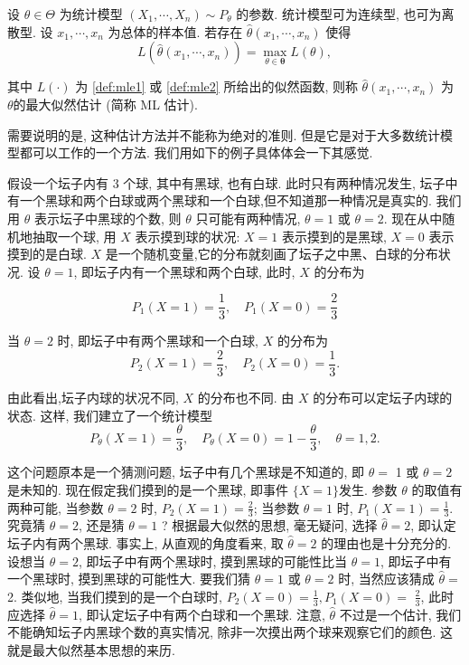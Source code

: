 \begin{definition}
    设 $\theta \in \Theta$ 为统计模型 $\left(X_1, \cdots, X_n\right) \sim P_\theta$ 的参数. 统计模型可为连续型, 也可为离散型. 设 $x_1, \cdots, x_n$ 为总体的样本值. 若存在 $\hat{\theta}\left(x_1, \cdots, x_n\right)$ 使得
$$
L\left(\hat{\theta}\left(x_1, \cdots, x_n\right)\right)=\max _{\theta \in \boldsymbol{\theta}} L(\theta),
$$

其中 $L(\cdot)$ 为 \cref{def:mle1} 或 \cref{def:mle2} 所给出的似然函数, 则称 $\hat{\theta}\left(x_1, \cdots, x_n\right)$ 为 $\theta$的最大似然估计 (简称 ML 估计).
\end{definition}

需要说明的是, 这种估计方法并不能称为绝对的准则. 但是它是对于大多数统计模型都可以工作的一个方法. 我们用如下的例子具体体会一下其感觉. 

\begin{example}
    假设一个坛子内有 3 个球, 其中有黑球, 也有白球. 此时只有两种情况发生, 坛子中有一个黑球和两个白球或两个黑球和一个白球,但不知道那一种情况是真实的. 我们用 $\theta$ 表示坛子中黑球的个数, 则 $\theta$ 只可能有两种情况, $\theta=1$ 或 $\theta=2$. 现在从中随机地抽取一个球, 用 $X$ 表示摸到球的状况: $X=1$ 表示摸到的是黑球, $X=0$ 表示摸到的是白球. $X$ 是一个随机变量,它的分布就刻画了坛子之中黑、白球的分布状况. 设 $\theta=1$, 即坛子内有一个黑球和两个白球, 此时, $X$ 的分布为

    $$
P_1(X=1)=\frac{1}{3}, \quad P_1(X=0)=\frac{2}{3}
$$

当 $\theta=2$ 时, 即坛子中有两个黑球和一个白球, $X$ 的分布为
$$
P_2(X=1)=\frac{2}{3}, \quad P_2(X=0)=\frac{1}{3} .
$$

由此看出,坛子内球的状况不同, $X$ 的分布也不同. 由 $X$ 的分布可以定坛子内球的状态. 这样, 我们建立了一个统计模型
$$
P_\theta(X=1)=\frac{\theta}{3}, \quad P_\theta(X=0)=1-\frac{\theta}{3}, \quad \theta=1,2 .
$$

这个问题原本是一个猜测问题, 坛子中有几个黑球是不知道的, 即 $\theta=$ 1 或 $\theta=2$ 是未知的. 现在假定我们摸到的是一个黑球, 即事件 $\{X=1\}$发生. 参数 $\theta$ 的取值有两种可能, 当参数 $\theta=2$ 时, $P_2(X=1)=\frac{2}{3}$; 当参数 $\theta=1$ 时, $P_1(X=1)=\frac{1}{3}$. 究竟猜 $\theta=2$, 还是猜 $\theta=1$ ? 根据最大似然的思想, 毫无疑问, 选择 $\hat{\theta}=2$, 即认定坛子内有两个黑球. 事实上, 从直观的角度看来, 取 $\hat{\theta}=2$ 的理由也是十分充分的. 设想当 $\theta=2$, 即坛子中有两个黑球时, 摸到黑球的可能性比当 $\theta=1$, 即坛子中有一个黑球时, 摸到黑球的可能性大. 要我们猜 $\theta=1$ 或 $\theta=2$ 时, 当然应该猜成 $\hat{\theta}=$ 2. 类似地, 当我们摸到的是一个白球时, $P_2(X=0)=\frac{1}{3}, P_1(X=0)=$ $\frac{2}{3}$, 此时应选择 $\hat{\theta}=1$, 即认定坛子中有两个白球和一个黑球. 注意, $\hat{\theta}$ 不过是一个估计, 我们不能确知坛子内黑球个数的真实情况, 除非一次摸出两个球来观察它们的颜色. 这就是最大似然基本思想的来历.
\end{example}


